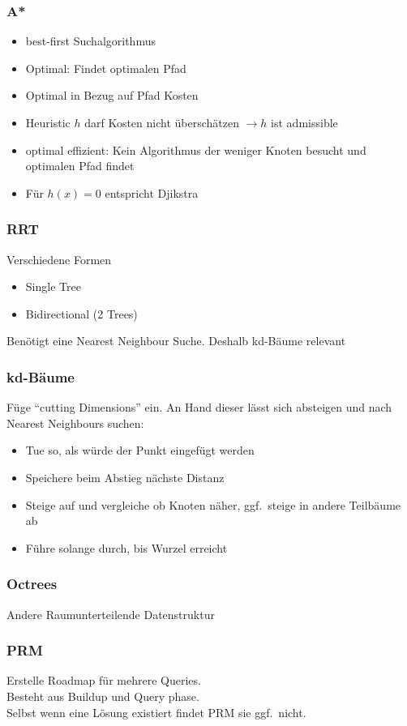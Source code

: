 \subsubsection{A*}%
\label{ag:ssub:a*}
\begin{itemize}
\item best-first Suchalgorithmus
\item Optimal: Findet optimalen Pfad
\item Optimal in Bezug auf Pfad Kosten
\item Heuristic \(h\) darf Kosten nicht überschätzen \(\rightarrow h\) ist admissible
\item optimal effizient: Kein Algorithmus der weniger Knoten besucht und optimalen Pfad findet
\item Für \(h(x) = 0\) entspricht Djikstra
\end{itemize}

\subsubsection{RRT}%
\label{ag:ssub:rrt}
Verschiedene Formen
\begin{itemize}
\item Single Tree
\item Bidirectional (2 Trees)
\end{itemize}
Benötigt eine Nearest Neighbour Suche. Deshalb kd-Bäume relevant

\subsubsection{kd-Bäume}%
\label{ag:ssub:kd-baeume}
Füge \enquote{cutting Dimensions} ein. An Hand dieser lässt sich absteigen und nach Nearest Neighbours suchen:
\begin{itemize}
\item Tue so, als würde der Punkt eingefügt werden
\item Speichere beim Abstieg nächste Distanz
\item Steige auf und vergleiche ob Knoten näher, ggf.\ steige in andere Teilbäume ab
\item Führe solange durch, bis Wurzel erreicht
\end{itemize}

\subsubsection{Octrees}%
\label{ag:ssub:octrees}
Andere Raumunterteilende Datenstruktur

\subsubsection{PRM}%
\label{ag:ssub:prm}
Erstelle Roadmap für mehrere Queries.\\
Besteht aus Buildup und Query phase.\\
Selbst wenn eine Lösung existiert findet PRM sie ggf.\ nicht.